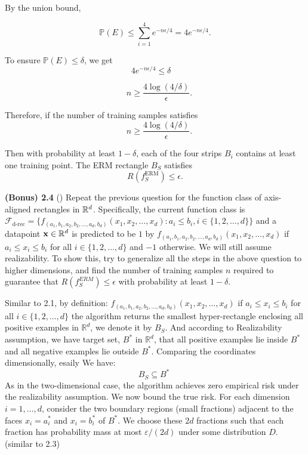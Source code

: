 By the union bound,

\[
\mathbb{P}(E) \le \sum_{i=1}^4 e^{-n \epsilon /4} = 4 e^{-n \epsilon /4}.
\]

To ensure $\mathbb{P}(E) \le \delta$, we get
\[
4 e^{-n \epsilon /4} \le \delta \quad 
\]

\[
\quad n \ge \frac{4 \log(4/\delta)}{\epsilon}.
\]

Therefore,  if the number of training samples satisfies 
\[
\quad n \ge \frac{4 \log(4/\delta)}{\epsilon}.
\]

Then with probability at least $1- \delta$, each of the four strips $B_i$ contains at least one training point. The ERM rectangle $B_S$ satisfies 
\[
R(f_S^{\mathrm{ERM}}) \le \epsilon.
\]

\bigskip

\textbf{(Bonus) 2.4} () Repeat the previous question for the function class of axis-aligned rectangles in $\mathbb{R}^d$. Specifically, the current function class is $\mathcal{F}_{\text{d-rec}}=\{f_{(a_1,b_1,a_2,b_2,\dots,a_d,b_d)}(x_1,x_2,\dots,x_d):a_i\leq b_i, i\in\{1,2,\dots,d\}\}$ and a datapoint $\mathbf{x}\in\mathbb{R}^d$ is predicted to be $1$ by $f_{(a_1,b_1,a_2,b_2,\dots,a_d,b_d)}(x_1,x_2,\dots,x_d)$ if $a_i\leq x_i\leq b_i$ for all $i\in\{1,2,\dots,d\}$ and $-1$ otherwise. We will still assume realizability. To show this, try to generalize all the steps in the above question to higher dimensions, and find the number of training samples $n$ required to guarantee that $R(f_S^{ERM})\le \epsilon$ with probability at least $1-\delta$. \\


Similar to 2.1, by definition:  $f_{(a_1,b_1,a_2,b_2,\dots,a_d,b_d)}(x_1,x_2,\dots,x_d)$ if $a_i\leq x_i\leq b_i$ for all $i\in\{1,2,\dots,d\}$
the algorithm returns the smallest hyper-rectangle enclosing all positive examples in $\mathbb{R}^d$,
we denote it by $B_S$. And according to Realizability assumption, we have target set, $B^*$ in $\mathbb{R}^d$, that all positive examples lie inside $B^*$ and all negative examples lie outside $B^*$. 
\bigskip
Comparing the coordinates dimensionally, esaily We have:
\[
B_S \subseteq B^* \;
\] 
As in the two-dimensional case, the algorithm achieves zero empirical risk under
the realizability assumption. We now bound the true risk.
For each dimension $i=1,\dots,d$, consider the two boundary regions (small fractions)
adjacent to the faces $x_i=a_i^*$ and $x_i=b_i^*$ of $B^*$. We choose these $2d$ fractions such that each fraction has probability mass at most
$\varepsilon/(2d)$ under some distribution $D$.(similar to 2.3)

